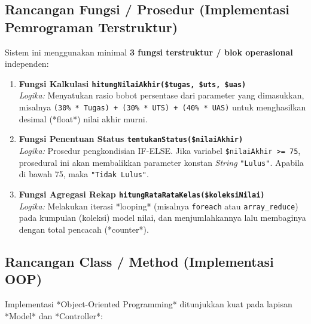 \documentclass[12pt, a4paper]{article}
\begin{document}
\subsection{Rancangan Fungsi / Prosedur (Implementasi Pemrograman Terstruktur)}
Sistem ini menggunakan minimal \textbf{3 fungsi terstruktur / blok operasional} independen:
\begin{enumerate}
    \item \textbf{Fungsi Kalkulasi \texttt{hitungNilaiAkhir(\$tugas, \$uts, \$uas)}} \\
    \textit{Logika:} Menyatukan rasio bobot persentase dari parameter yang dimasukkan, misalnya \texttt{(30\% * Tugas) + (30\% * UTS) + (40\% * UAS)} untuk menghasilkan desimal (*float*) nilai akhir murni.

    \item \textbf{Fungsi Penentuan Status \texttt{tentukanStatus(\$nilaiAkhir)}} \\
    \textit{Logika:} Prosedur pengkondisian IF-ELSE. Jika variabel \texttt{\$nilaiAkhir >= 75}, prosedural ini akan membalikkan parameter konstan \textit{String} \texttt{"Lulus"}. Apabila di bawah 75, maka \texttt{"Tidak Lulus"}.

    \item \textbf{Fungsi Agregasi Rekap \texttt{hitungRataRataKelas(\$koleksiNilai)}} \\
    \textit{Logika:} Melakukan iterasi *looping* (misalnya \texttt{foreach} atau \texttt{array\_reduce}) pada kumpulan (koleksi) model nilai, dan menjumlahkannya lalu membaginya dengan total pencacah (*counter*).
\end{enumerate}

\subsection{Rancangan Class / Method (Implementasi OOP)}
Implementasi *Object-Oriented Programming* ditunjukkan kuat pada lapisan *Model* dan *Controller*:
\end{document}
